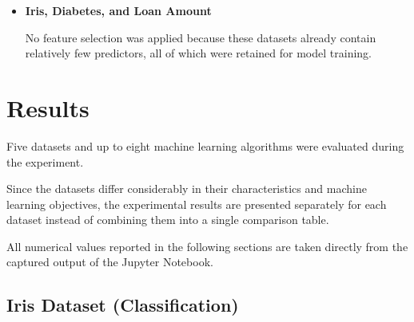 \documentclass[12pt,a4paper]{article}
\begin{document}
\begin{enumerate}
\begin{itemize}
\[
100
\]

features using

\[
\texttt{SelectKBest}(f_{\text{classif}}).
\]

\vspace{0.2cm}

\item \textbf{Iris, Diabetes, and Loan Amount}

No feature selection was applied because these datasets already contain
relatively few predictors, all of which were retained for model training.

\end{itemize}

\end{enumerate}

\section{Results}

Five datasets and up to eight machine learning algorithms were evaluated
during the experiment.

Since the datasets differ considerably in their characteristics and machine
learning objectives, the experimental results are presented separately for
each dataset instead of combining them into a single comparison table.

All numerical values reported in the following sections are taken directly
from the captured output of the Jupyter Notebook.

\subsection{Iris Dataset (Classification)}
\end{document}
